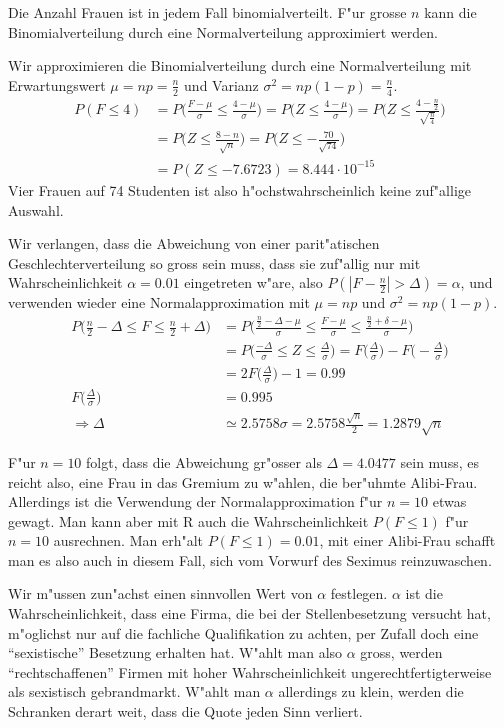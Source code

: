 \begin{loesung}
Die Anzahl Frauen ist in jedem Fall binomialverteilt.
F"ur grosse $n$ kann die Binomialverteilung durch eine Normalverteilung
approximiert werden.
\begin{teilaufgaben}
\item
Wir approximieren die Binomialverteilung durch eine Normalverteilung
mit Erwartungswert $\mu=np=\frac{n}2$ und Varianz $\sigma^2=np(1-p)=\frac{n}4$.
\begin{align*}
P(F\le 4)
&=
P\biggl( \frac{F-\mu}{\sigma}\le \frac{4-\mu}{\sigma} \biggr)
=
P\biggl( Z\le \frac{4-\mu}{\sigma} \biggr)
=
P\biggl( Z\le \frac{4-\frac{n}2}{\sqrt{\frac{n}4}}\biggr)
\\
&=
P\biggl( Z\le \frac{8-n}{\sqrt{n}}\biggr)
=
P\biggl( Z\le -\frac{70}{\sqrt{74}}\biggr)
\\
&=
P(Z\le -7.6723)= 8.444\cdot 10^{-15}
\end{align*}
Vier Frauen auf 74 Studenten ist also h"ochstwahrscheinlich keine
zuf"allige Auswahl.
\item
Wir verlangen, dass die Abweichung von einer parit"atischen
Geschlechterverteilung so gross sein muss, dass sie zuf"allig nur
mit Wahrscheinlichkeit $\alpha = 0.01$ eingetreten w"are, also
$P(|F-\frac{n}2| >\Delta)=\alpha$, und verwenden wieder eine
Normalapproximation mit $\mu=np$ und $\sigma^2=np(1-p)$.
\begin{align*}
P\biggl(\frac{n}2-\Delta\le F\le\frac{n}2+\Delta\biggr)
&=
P\biggl(\frac{\frac{n}2-\Delta-\mu}{\sigma}\le \frac{F-\mu}{\sigma}\le \frac{\frac{n}2+\delta-\mu}{\sigma}\biggr)
\\
&=
P\biggl(
\frac{-\Delta}{\sigma}\le Z\le \frac{\Delta}{\sigma}
\biggr)
=
F\biggl(\frac{\Delta}{\sigma}\biggr)
-
F\biggl(-\frac{\Delta}{\sigma}\biggr)
\\
&=
2F\biggl(\frac{\Delta}{\sigma}\biggr)-1=0.99
\\
F\biggl(\frac{\Delta}{\sigma}\biggr)&=0.995\\
\Rightarrow \Delta&\simeq 2.5758\sigma=2.5758\frac{ \sqrt{n}}2=1.2879\sqrt{n}
\end{align*}
\item
F"ur $n=10$ folgt, dass die Abweichung gr"osser als $\Delta = 4.0477$ sein
muss, es reicht also, eine Frau in das Gremium zu w"ahlen, die ber"uhmte
Alibi-Frau. Allerdings ist die Verwendung der Normalapproximation f"ur
$n=10$ etwas gewagt. Man kann aber mit R auch die Wahrscheinlichkeit
$P(F\le 1)$ f"ur $n=10$ ausrechnen. Man erh"alt $P(F\le 1)=0.01$, mit
einer Alibi-Frau schafft man es also auch in diesem Fall, sich vom
Vorwurf des Seximus reinzuwaschen.
\item
Wir m"ussen zun"achst einen sinnvollen Wert von $\alpha$ festlegen. $\alpha$
ist die Wahrscheinlichkeit, dass eine Firma, die bei der Stellenbesetzung
versucht hat, m"oglichst nur auf die fachliche Qualifikation zu achten,
per Zufall doch eine ``sexistische'' Besetzung erhalten hat. W"ahlt man
also $\alpha$ gross, werden ``rechtschaffenen'' Firmen mit hoher
Wahrscheinlichkeit ungerechtfertigterweise als sexistisch gebrandmarkt.
W"ahlt man $\alpha$ allerdings zu klein, werden die Schranken derart weit,
dass die Quote jeden Sinn verliert.


\end{teilaufgaben}
\end{loesung}
